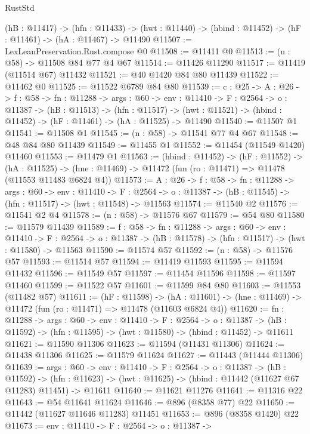 \begin{lexlean}{RustStd}
\begin{coremodule}
  (hB : @11417) ->
  (hfn : @11433) -> (hwt : @11440) -> (hbind : @11452) -> (hF : @11461) -> (hA : @11467) -> @11490
@11507 := LexLeanPreservation.Rust.compose @0
@11508 := @11411 @0
@11513 := (n : @58) -> @11508 @84 @77 @4 @67
@11514 := @11426 @11290
@11517 := @11419 (@11514 @67) @11432
@11521 := @40 @1420 @84 @80 @11439
@11522 := @11462 @0
@11525 := @11522 @6789 @84 @80
@11539 := {c : @25} ->
  {A : @26} ->
  {f : @58} ->
  {fn : @11288} ->
  {args : @60} ->
  {env : @11410} ->
  {F : @2564} ->
  {o : @11387} ->
  (hB : @11513) ->
  (hfn : @11517) -> (hwt : @11521) -> (hbind : @11452) -> (hF : @11461) -> (hA : @11525) -> @11490
@11540 := @11507 @1
@11541 := @11508 @1
@11545 := (n : @58) -> @11541 @77 @4 @67
@11548 := @48 @84 @80 @11439
@11549 := @11455 @1
@11552 := @11454 (@11549 @1420) @11460
@11553 := @11479 @1
@11563 := (hbind : @11452) ->
  (hF : @11552) ->
  (hA : @11525) -> (hne : @11469) -> @11472 (fun (ro : @11471) => @11478 (@11553 @11483 @6824 @4))
@11573 := {A : @26} ->
  {f : @58} ->
  {fn : @11288} ->
  {args : @60} ->
  {env : @11410} ->
  {F : @2564} -> {o : @11387} -> (hB : @11545) -> (hfn : @11517) -> (hwt : @11548) -> @11563
@11574 := @11540 @2
@11576 := @11541 @2 @4
@11578 := (n : @58) -> @11576 @67
@11579 := @54 @80
@11580 := @11579 @11439
@11589 := {f : @58} ->
  {fn : @11288} ->
  {args : @60} ->
  {env : @11410} ->
  {F : @2564} -> {o : @11387} -> (hB : @11578) -> (hfn : @11517) -> (hwt : @11580) -> @11563
@11590 := @11574 @57
@11592 := (n : @58) -> @11576 @57
@11593 := @11514 @57
@11594 := @11419 @11593
@11595 := @11594 @11432
@11596 := @11549 @57
@11597 := @11454 @11596
@11598 := @11597 @11460
@11599 := @11522 @57
@11601 := @11599 @84 @80
@11603 := @11553 (@11482 @57)
@11611 := (hF : @11598) ->
  (hA : @11601) -> (hne : @11469) -> @11472 (fun (ro : @11471) => @11478 (@11603 @6824 @4))
@11620 := {fn : @11288} ->
  {args : @60} ->
  {env : @11410} ->
  {F : @2564} ->
  {o : @11387} -> (hB : @11592) -> (hfn : @11595) -> (hwt : @11580) -> (hbind : @11452) -> @11611
@11621 := @11590 @11306
@11623 := @11594 (@11431 @11306)
@11624 := @11438 @11306
@11625 := @11579 @11624
@11627 := @11443 (@11444 @11306)
@11639 := {args : @60} ->
  {env : @11410} ->
  {F : @2564} ->
  {o : @11387} ->
  (hB : @11592) ->
  (hfn : @11623) -> (hwt : @11625) -> (hbind : @11442 (@11627 @67 @11283) @11451) -> @11611
@11640 := @11621 @11276
@11641 := @11316 @22
@11643 := @54 @11641 @11624
@11646 := @896 (@8358 @77) @22
@11650 := @11442 (@11627 @11646 @11283) @11451
@11653 := @896 (@8358 @1420) @22
@11673 := {env : @11410} ->
  {F : @2564} ->
  {o : @11387} ->

\end{coremodule}
\end{lexlean}
